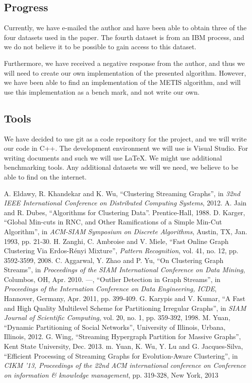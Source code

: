 \documentclass[a4paper,11pt]{article}
\begin{document}
\subsection{Progress}
Currently, we have e-mailed the author and have been able to obtain three of the four datasets used in the paper. The fourth dataset is from an IBM process, and we do not believe it to be possible to gain access to this dataset. 

Furthermore, we have received a negative response from the author, and thus we will need to create our own implementation of the presented algorithm. However, we have been able to find an implementation of the METIS algorithm, and will use this implementation as a bench mark, and not write our own. 



\subsection{Tools} 
We have decided to use git as a code repository for the project, and we will write our code in C++. The development environment we will use is Visual Studio. For writing documents and such we will use \LaTeX. We might use additional benchmarking tools. Any additional datasets we will we need, we believe to be able to find on the internet. 

\begin{thebibliography}{99}
 A. Eldawy, R. Khandekar and K. Wu, ``Clustering Streaming Graphs'', in \textit{32nd IEEE International Conference on Distributed Computing Systems}, 2012.
 A. Jain and R. Dubes, ``Algorithms for Clustering Data''. Prentice-Hall, 1988.
 D. Karger, ``Global Min-cuts in RNC, and Other Ramifications of a Simple Min-Cut Algorithm'', in \textit{ACM-SIAM Symposium on Discrete Algorithms}, Austin, TX, Jan. 1993, pp. 21-30.
 H. Zanghi, C. Ambroise and V. Miele, ``Fast Online Graph Clustering Via Erdos-Rényi Mixture'', \textit{Pattern Recognition}, vol. 41, no. 12, pp. 3592-3599, 2008.
 C. Aggarwal, Y. Zhao and P. Yu, ``On Clustering Graph Streams'', in \textit{Proceedings of the SIAM International Conference on Data Mining}, Columbos, OH, Apr. 2010.
 ---,  ``Outlier Detection in Graph Streams'', in \textit{Proceedings of the Internation Conference on Data Engineering, ICDE}, Hannover, Germany, Apr. 2011, pp. 399-409.
 G. Karypis and V. Kumar, ``A Fast and High Quality Multilevel Scheme for Partitioning Irregular Graphs'', in \textit{SIAM Journal of Scientific Computing}, vol. 20, no. 1, pp. 359-392, 1998.
 M. Yuan, ``Dynamic Partitioning of Social Networks'', University of Illinois, Urbana, Illinois, 2012.
 G. Wing, ``Streaming Hypergraph Partition for Massive Graphs'', Kent State University, Dec. 2013.
 m. Yuan, K. Wu, Y. Lu and G. Jacques-Silva, ``Efficient Processing of Streaming Graphs for Evolution-Aware Clustering'', in \textit{CIKM '13, Proceedings of the 22nd ACM international conference on Conference on information \& knowledge management}, pp. 319-328, New York, 2013
\end{thebibliography}
\end{document}
